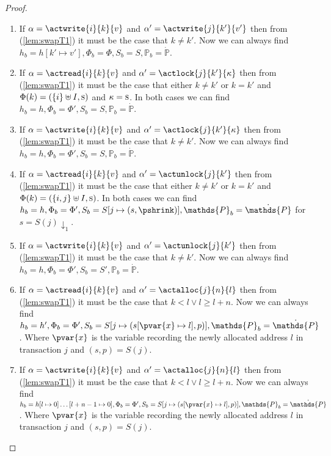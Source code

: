 \begin{lem}
\begin{proof}
\begin{enumerate}[label=({\roman*})]
		\item If $\alpha = \actwrite{i}{k}{v}$ and $\alpha' = \actwrite{j}{k'}{v'}$ then from (\ref{lem:swapT1}) it must be the case that $k \neq k'$. Now we can always find $h_b = h[k' \mapsto v'], \Phi_b = \Phi, S_b = S, \mathds{P}_b = \dot{\mathds{P}}$.
		
		\item If $\alpha = \actread{i}{k}{v}$ and $\alpha' = \actlock{j}{k'}{\kappa}$ then from (\ref{lem:swapT1}) it must be the case that either $k \neq k'$ or $k = k'$ and $\Phi(k) = (\{i\} \uplus I, \textsc{s})$ and $\kappa = \textsc{s}$. In both cases we can find $h_b = h, \Phi_b = \Phi', S_b = S, \mathds{P}_b = \dot{\mathds{P}}$.
		
		\item If $\alpha = \actwrite{i}{k}{v}$ and $\alpha' = \actlock{j}{k'}{\kappa}$ then from (\ref{lem:swapT1}) it must be the case that $k \neq k'$. Now we can always find $h_b = h, \Phi_b = \Phi', S_b = S, \mathds{P}_b = \dot{\mathds{P}}$.
		
		\item If $\alpha = \actread{i}{k}{v}$ and $\alpha' = \actunlock{j}{k'}$ then from (\ref{lem:swapT1}) it must be the case that either $k \neq k'$ or $k = k'$ and $\Phi(k) = (\{i,j\} \uplus I, \textsc{s})$. In both cases we can find $h_b = h, \Phi_b = \Phi', S_b = S[j \mapsto (s, \pshrink)], \mathds{P}_b = \dot{\mathds{P}}$ for $s = S(j) \downarrow_1$.
		
		\item If $\alpha = \actwrite{i}{k}{v}$ and $\alpha' = \actunlock{j}{k'}$ then from (\ref{lem:swapT1}) it must be the case that $k \neq k'$. Now we can always find $h_b = h, \Phi_b = \Phi', S_b = S', \mathds{P}_b = \dot{\mathds{P}}$.
		
		\item If $\alpha = \actread{i}{k}{v}$ and $\alpha' = \actalloc{j}{n}{l}$ then from (\ref{lem:swapT1}) it must be the case that $k < l \lor l \geq l + n$. Now we can always find $h_b = h', \Phi_b = \Phi', S_b = S[j \mapsto (s[\pvar{x} \mapsto l], p)], \mathds{P}_b = \dot{\mathds{P}}$. Where $\pvar{x}$ is the variable recording the newly allocated address $l$ in transaction $j$ and $(s, p) = S(j)$.
		
		\item If $\alpha = \actwrite{i}{k}{v}$ and $\alpha' = \actalloc{j}{n}{l}$ then from (\ref{lem:swapT1}) it must be the case that $k < l \lor l \geq l + n$. Now we can always find $h_b = h[l \mapsto 0]\ldots[l + n - 1 \mapsto 0], \Phi_b = \Phi', S_b = S[j \mapsto (s[\pvar{x} \mapsto l], p)], \mathds{P}_b = \dot{\mathds{P}}$. Where $\pvar{x}$ is the variable recording the newly allocated address $l$ in transaction $j$ and $(s, p) = S(j)$.
		

\end{enumerate}
\end{proof}
\end{lem}
